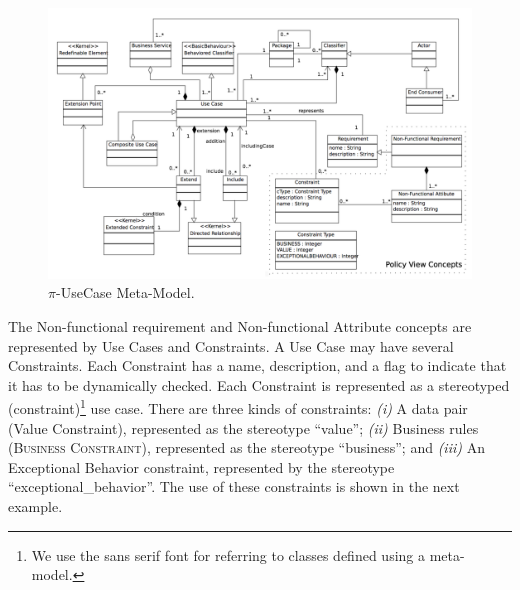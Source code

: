 \documentclass{singlecol-new}
\theoremstyle{TH}{
\newtheorem{lemma}{Lemma}
\newtheorem{theorem}[lemma]{Theorem}
\newtheorem{corrolary}[lemma]{Corrolary}
\newtheorem{conjecture}[lemma]{Conjecture}
\newtheorem{proposition}[lemma]{Proposition}
\newtheorem{claim}[lemma]{Claim}
\newtheorem{stheorem}[lemma]{Wrong Theorem}
\newtheorem{algorithm}{Algorithm}
}
\theoremstyle{THrm}{
\newtheorem{definition}{Definition}[section]
\newtheorem{question}{Question}[section]
\newtheorem{remark}{Remark}
\newtheorem{scheme}{Scheme}
}
\theoremstyle{THhit}{
\newtheorem{case}{Case}[section]
}
\theoremstyle{THhsl}{
\newtheorem{example}{Example}
}
\begin{document}
 \begin{figure}[h]
\center
\includegraphics[width=1\textwidth]{./figures/UseCaseMetaModel.pdf}
\caption{\label{fig:CIM:usecasemetamodel} $\pi$-UseCase Meta-Model.}
\end{figure}


 The {\sc Non-functional requirement} and {\sc Non-functional Attribute} concepts are represented by {\sc Use Cases} and {\sc Constraints}.
A {\sc Use Case} may have several {\sc Constraints}. Each {\sc Constraint} has a name, description, and a flag to indicate that it has to be  dynamically checked.
Each {\sc Con\-straint} is represented as a stereotyped ({\sf constraint})\footnote{We use the {\sf sans serif} font for referring to classes defined using a meta-model.} use case.
There are three kinds of constraints:
\textit{(i)} A data pair ({\sc Value Constraint}), represented as the stereotype ``value'';
\textit{(ii)} Business rules (\textsc{Business Constraint}), represented as the stereotype {\sf ``business''}; and
\textit{(iii)} An {\sc Exceptional Behavior} constraint, represented by the stereotype {\sf ``exceptional\_behavior''}.
The use of these constraints is shown in the next example.
\end{document}
